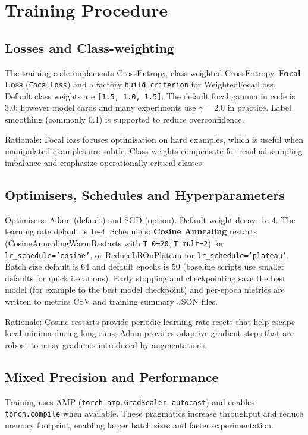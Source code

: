 \documentclass[11pt]{report}
\begin{document}
\section{Training Procedure}
\subsection{Losses and Class-weighting}
The training code implements CrossEntropy, class-weighted CrossEntropy,
\textbf{Focal Loss} (\texttt{FocalLoss}) and a factory \texttt{build_criterion}
for WeightedFocalLoss. Default class weights are \texttt{[1.5, 1.0, 1.5]}. The
default focal gamma in code is 3.0; however model cards and many experiments
use $\gamma=2.0$ in practice. Label smoothing (commonly 0.1) is supported to
reduce overconfidence.

Rationale: Focal loss focuses optimisation on hard examples, which is useful
when manipulated examples are subtle. Class weights compensate for residual
sampling imbalance and emphasize operationally critical classes.

\subsection{Optimisers, Schedules and Hyperparameters}
Optimisers: Adam (default) and SGD (option). Default weight decay: 1e-4. The
learning rate default is 1e-4. Schedulers: \textbf{Cosine Annealing}
restarts (CosineAnnealingWarmRestarts with \texttt{T_0=20}, \texttt{T_mult=2}) for \texttt{lr_schedule='cosine'}, or ReduceLROnPlateau for \texttt{lr_schedule='plateau'}.
Batch size default is 64 and default epochs is 50 (baseline scripts use
smaller defaults for quick iterations). Early stopping and checkpointing save
the best model (for example to the best model checkpoint) and per-epoch metrics
are written to metrics CSV and training summary JSON files.

Rationale: Cosine restarts provide periodic learning rate resets that help
escape local minima during long runs; Adam provides adaptive gradient steps that
are robust to noisy gradients introduced by augmentations.

\subsection{Mixed Precision and Performance}
Training uses AMP (\texttt{torch.amp.GradScaler}, \texttt{autocast}) and
enables \texttt{torch.compile} when available. These pragmatics increase
throughput and reduce memory footprint, enabling larger batch sizes and
faster experimentation.
\end{document}
